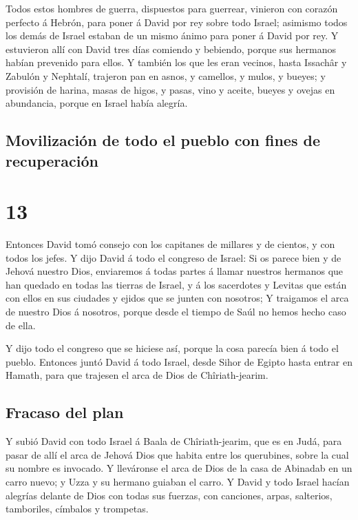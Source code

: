  Todos estos hombres de guerra, dispuestos para guerrear,
vinieron con corazón perfecto á Hebrón, para poner á David por rey sobre
todo Israel; asimismo todos los demás de Israel estaban de un mismo
ánimo para poner á David por rey.  Y estuvieron allí con
David tres días comiendo y bebiendo, porque sus hermanos habían
prevenido para ellos.  Y también los que les eran
vecinos, hasta Issachâr y Zabulón y Nephtalí, trajeron pan en asnos, y
camellos, y mulos, y bueyes; y provisión de harina, masas de higos, y
pasas, vino y aceite, bueyes y ovejas en abundancia, porque en Israel
había alegría.

\hypertarget{movilizaciuxf3n-de-todo-el-pueblo-con-fines-de-recuperaciuxf3n}{%
\subsection{Movilización de todo el pueblo con fines de
recuperación}\label{movilizaciuxf3n-de-todo-el-pueblo-con-fines-de-recuperaciuxf3n}}

\hypertarget{section-12}{%
\section{13}\label{section-12}}

 Entonces David tomó consejo con los capitanes de millares
y de cientos, y con todos los jefes.  Y dijo David á todo
el congreso de Israel: Si os parece bien y de Jehová nuestro Dios,
enviaremos á todas partes á llamar nuestros hermanos que han quedado en
todas las tierras de Israel, y á los sacerdotes y Levitas que están con
ellos en sus ciudades y ejidos que se junten con nosotros;
 Y traigamos el arca de nuestro Dios á nosotros, porque
desde el tiempo de Saúl no hemos hecho caso de ella.

 Y dijo todo el congreso que se hiciese así, porque la
cosa parecía bien á todo el pueblo.  Entonces juntó David
á todo Israel, desde Sihor de Egipto hasta entrar en Hamath, para que
trajesen el arca de Dios de Chîriath-jearim.

\hypertarget{fracaso-del-plan}{%
\subsection{Fracaso del plan}\label{fracaso-del-plan}}

 Y subió David con todo Israel á Baala de Chîriath-jearim,
que es en Judá, para pasar de allí el arca de Jehová Dios que habita
entre los querubines, sobre la cual su nombre es invocado.
 Y lleváronse el arca de Dios de la casa de Abinadab en un
carro nuevo; y Uzza y su hermano guiaban el carro.  Y
David y todo Israel hacían alegrías delante de Dios con todas sus
fuerzas, con canciones, arpas, salterios, tamboriles, címbalos y
trompetas.

